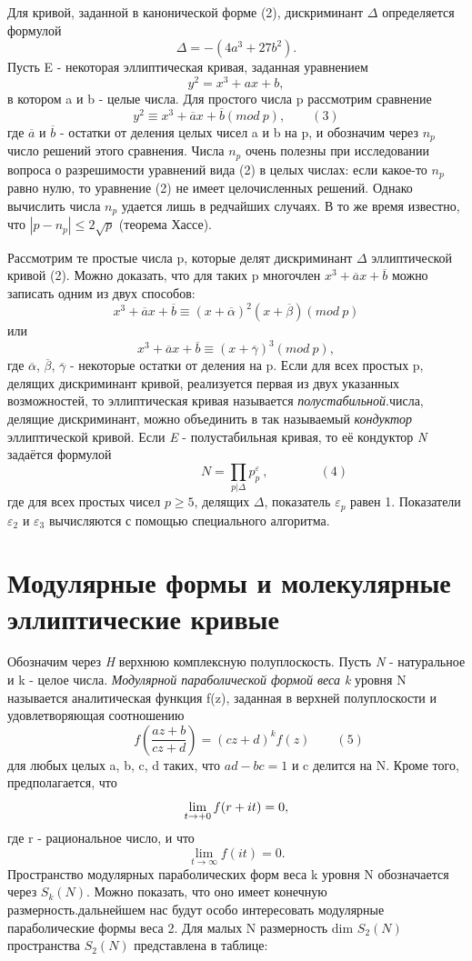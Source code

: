 \begin{multicols}{3}
Для кривой, заданной в канонической форме (2), дискриминант $\Delta$ определяется формулой \[\Delta = -(4a^3+27b^2).\] Пусть E - некоторая эллиптическая кривая, заданная уравнением \[y^2 = x^3+ax+b,\] в котором a и b - целые числа. Для простого числа p рассмотрим сравнение \[y^2 \equiv x^3+\overline ax+\overline b (mod\: p), \qquad (3)\] где $\overline a$ и $\overline b$ - остатки от деления целых чисел a и b на p, и обозначим через $n_p$ число решений этого сравнения. Числа $n_p$ очень полезны при исследовании вопроса о разрешимости уравнений вида (2) в целых числах: если какое-то $n_p$ равно нулю, то уравнение (2) не имеет целочисленных решений. Однако вычислить числа $n_p$ удается лишь в редчайших случаях. В то же время известно, что $|p-n_p| \leq 2\sqrt{p}$ (теорема Хассе).\par Рассмотрим те простые числа p, которые делят дискриминант $\Delta$ эллиптической кривой (2). Можно доказать, что для таких p многочлен $x^3+\overline a x + \overline b$ можно записать одним из двух способов: \[x^3+\overline a x+\overline b \equiv (x+\overline \alpha)^2(x+\overline \beta)(mod\:p)\]или \[x^3+\overline a x+\overline b \equiv (x+\overline \gamma)^3(mod\:p),\] где $\overline \alpha$, $\overline \beta$, $\overline \gamma$ - некоторые остатки от деления на p. Если для всех простых p, делящих дискриминант кривой, реализуется первая из двух указанных возможностей, то эллиптическая кривая  называется \textit{полустабильной}. числа, делящие дискриминант, можно объединить в так называемый \textit{кондуктор} эллиптической кривой. Если \textit{E} - полустабильная кривая, то её кондуктор \textit{N} задаётся формулой \[\qquad \qquad \quad \quad N=\prod_{p|\Delta} p^\varepsilon_p \:,\qquad \qquad (4)\] где для всех простых чисел $p \geq 5$, делящих $\Delta$, показатель $\varepsilon_p$ равен 1. Показатели $\varepsilon_2$ и $\varepsilon_3$ вычисляются с помощью специального алгоритма.\section*{Модулярные формы и молекулярные эллиптические кривые} Обозначим через \textit{H} верхнюю комплексную полуплоскость. Пусть \textit{N} - натуральное и k - целое числа. \textit{Модулярной параболической формой веса k} уровня N называется аналитическая функция f(z), заданная в верхней полуплоскости и удовлетворяющая соотношению \[ \qquad f(\frac{az+b}{cz+d}) = (cz+d)^kf(z) \qquad(5)\] для любых целых a, b, c, d таких, что $ad-bc=1$ и c делится на N. Кроме того, предполагается, что\[\lim_{t \to\\+0} f(r+it) = 0,\]где r - рациональное число, и что \[\lim_{t\to\infty} f(it) = 0.\] Пространство модулярных параболических форм веса k уровня N обозначается через $S_k(N)$. Можно показать, что оно имеет конечную размерность. дальнейшем нас будут особо интересовать модулярные параболические формы веса 2. Для малых N размерность dim $S_2(N)$ пространства $S_2(N)$ представлена в таблице: 

\end{multicols}

